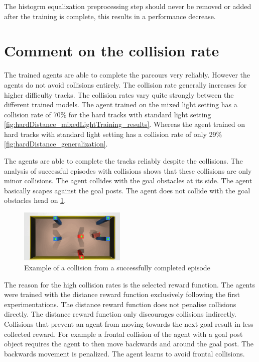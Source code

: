The histogrm equalization preprocessing step should never be removed or added after the training is complete, this results in a performance decrease.

\section{Comment on the collision rate}

The trained agents are able to complete the parcours very reliably. However the agents do not avoid collisions entirely. The collision rate generally increases for higher difficulty tracks. The collision rates vary quite strongly between the different trained models. The agent trained on the mixed light setting has a collision rate of 70\% for the hard tracks with standard light setting \ref{fig:hardDistance_mixedLightTraining_results}. Whereas the agent trained on hard tracks with standard light setting has a collision rate of only 29\% \ref{fig:hardDistance_generalization}.

The agents are able to complete the tracks reliably despite the collisions. The analysis of successful episodes with collisions shows that these collisions are only minor collisions. The agent collides with the goal obstacles at its side. The agent basically scapes against the goal posts. The agent does not collide with the goal obstacles head on \ref{fig:example_collision}.

\begin{figure}
    \centering
    \includegraphics[width=0.45\textwidth]{Bilder/example_minor_collision_topview_frame_1295.png}
    \caption{Example of a collision from a successfully completed episode}
    \label{fig:example_collision}
\end{figure}

The reason for the high collision rates is the selected reward function. The agents were trained with the distance reward function exclusively following the first experimentations. The distance reward function does not penalise collisions directly. The distance reward function only discourages collisions indirectly. Collisions that prevent an agent from moving towards the next goal result in less collected reward. For example a frontal collision of the agent with a goal post object requires the agent to then move backwards and around the goal post. The backwards movement is penalized. The agent learns to avoid frontal collisions.

